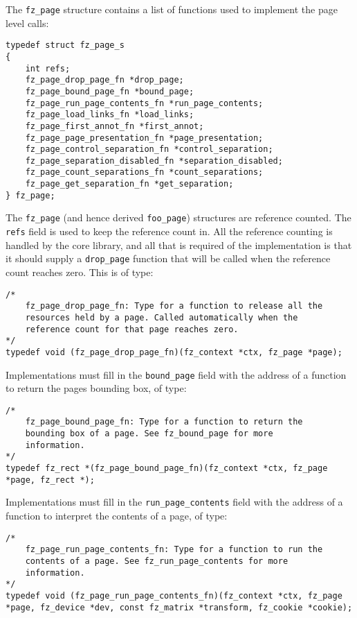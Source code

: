 \documentclass[oneside]{book}
\begin{document}
The \texttt{fz\_page} structure contains a list of functions used to implement the page level calls:

\begin{lstlisting}
typedef struct fz_page_s
{
	int refs;
	fz_page_drop_page_fn *drop_page;
	fz_page_bound_page_fn *bound_page;
	fz_page_run_page_contents_fn *run_page_contents;
	fz_page_load_links_fn *load_links;
	fz_page_first_annot_fn *first_annot;
	fz_page_page_presentation_fn *page_presentation;
	fz_page_control_separation_fn *control_separation;
	fz_page_separation_disabled_fn *separation_disabled;
	fz_page_count_separations_fn *count_separations;
	fz_page_get_separation_fn *get_separation;
} fz_page;
\end{lstlisting}

The \texttt{fz\_page} (and hence derived \texttt{foo\_page}) structures are reference counted. The \texttt{refs} field is used to keep the reference count in. All the reference counting is handled by the core library, and all that is required of the implementation is that it should supply a \texttt{drop\_page} function that will be called when the reference count reaches zero. This is of type:

\begin{lstlisting}
/*
	fz_page_drop_page_fn: Type for a function to release all the
	resources held by a page. Called automatically when the
	reference count for that page reaches zero.
*/
typedef void (fz_page_drop_page_fn)(fz_context *ctx, fz_page *page);
\end{lstlisting}

Implementations must fill in the \texttt{bound\_page} field with the address of a function to return the pages bounding box, of type:

\begin{lstlisting}
/*
	fz_page_bound_page_fn: Type for a function to return the
	bounding box of a page. See fz_bound_page for more
	information.
*/
typedef fz_rect *(fz_page_bound_page_fn)(fz_context *ctx, fz_page *page, fz_rect *);
\end{lstlisting}

Implementations must fill in the \texttt{run\_page\_contents} field with the address of a function to interpret the contents of a page, of type:

\begin{lstlisting}
/*
	fz_page_run_page_contents_fn: Type for a function to run the
	contents of a page. See fz_run_page_contents for more
	information.
*/
typedef void (fz_page_run_page_contents_fn)(fz_context *ctx, fz_page *page, fz_device *dev, const fz_matrix *transform, fz_cookie *cookie);
\end{lstlisting}
\end{document}
